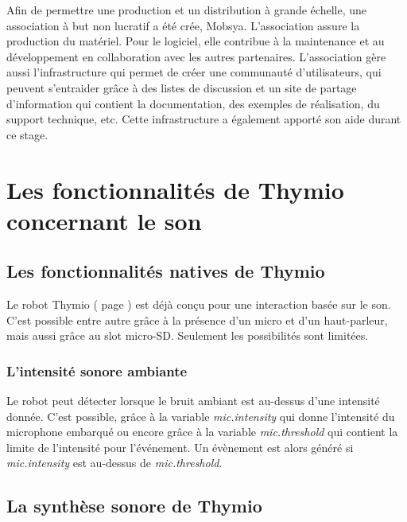 \documentclass[a4paper, 12pt]{report}
\begin{document}
Afin de permettre une production et un distribution à grande échelle, une association à but non lucratif a été crée, Mobsya. L'association assure la production du matériel. Pour le logiciel, elle contribue à la maintenance et au développement en collaboration avec les autres partenaires. L'association gère aussi l'infrastructure qui permet de créer une communauté d'utilisateurs, qui peuvent s'entraider grâce à des listes de discussion et un site de partage d'information qui contient la documentation, des exemples de réalisation, du support technique, etc. Cette infrastructure a également apporté son aide durant ce stage.

\chapter{Les fonctionnalités de Thymio concernant le son}
\section{Les fonctionnalités natives de Thymio }
Le robot Thymio ( page\pageref{thymio} ) est déjà conçu pour une interaction basée sur le son. C'est possible entre autre grâce à la présence d'un micro et d'un haut-parleur, mais aussi grâce au slot micro-SD. Seulement les possibilités sont limitées.

\subsection{L'intensité sonore ambiante}
Le robot peut détecter lorsque le bruit ambiant est au-dessus d'une intensité donnée. C'est possible, grâce à la variable \textit{mic.intensity} qui donne l'intensité du microphone embarqué ou encore grâce à la variable \textit{mic.threshold} qui contient la limite de l'intensité pour l'événement. Un évènement est alors généré si \textit{mic.intensity} est au-dessus de \textit{mic.threshold}.

\section{La synthèse sonore de Thymio}
\end{document}
